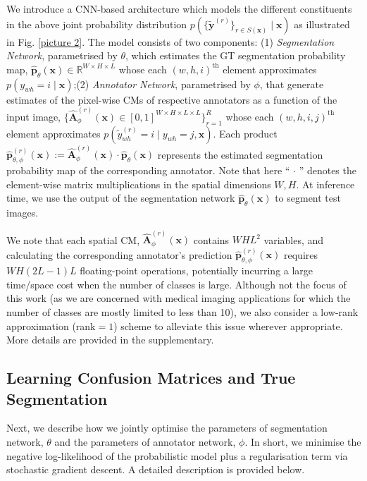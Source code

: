 We introduce a CNN-based architecture which models the different constituents in the above joint probability distribution $p(\{\tilde{\textbf{y}}^{(r)}\}_{r\in S(\mathbf{x})}\mid \textbf{x})$ as illustrated in Fig. \ref{picture 2}. The model consists of two components: (1) \textit{Segmentation Network}, parametrised by $\theta$, which estimates the GT segmentation probability map, $\hat{\textbf{p}}_{\theta}(\textbf{x}) \in \mathbb{R}^{W\times H \times L}$ whose each $(w, h, i)^\text{th}$ element approximates $p(y_{wh}=i\mid \textbf{x})$;(2) \textit{Annotator Network}, parametrised by $\phi$, that generate estimates of the pixel-wise CMs of respective annotators as a function of the input image, $\{\hat{\textbf{A}}_{\phi}^{(r)}(\textbf{x})\in [0,1]^{W\times H\times L \times L}\}_{r=1}^{R}$ whose each $(w, h, i, j)^\text{th}$ element approximates $p(\tilde{y}^{(r)}_{wh}=i\mid y_{wh}=j,\textbf{x})$. Each product ${\hat{\textbf{p}}_{\theta, \phi}^{(r)}}(\textbf{x}):=\hat{\textbf{A}}_{\phi}^{(r)}(\textbf{x})\cdot \hat{\textbf{p}}_\theta (\textbf{x})$ represents the estimated segmentation probability map of the corresponding annotator. Note that here ``$\,\cdot\,$'' denotes the element-wise matrix multiplications in the spatial dimensions $W, H$. At inference time, we use the output of the segmentation network ${\hat{\textbf{p}}_\theta }(\textbf{x})$ to segment test images. 

We note that each spatial CM, $\hat{\textbf{A}}_{\phi}^{(r)}(\textbf{x})$ contains $WHL^2$ variables, 
and calculating the corresponding annotator's prediction $\hat{\textbf{p}}_{\theta, \phi}^{(r)}(\textbf{x})$ requires $WH(2L-1)L$ floating-point operations, potentially incurring a large time/space cost when the number of classes is large. Although not the focus of this work (as we are concerned with medical imaging applications for which the number of classes are mostly limited to less than 10), we also consider a low-rank approximation (rank$=1$) scheme to alleviate this issue wherever appropriate. More details are provided in the supplementary.

\subsection{Learning Confusion Matrices and True Segmentation}

Next, we describe how we jointly optimise the parameters of segmentation network, $\theta$ and the parameters of annotator network, $\phi$. In short, we minimise the negative log-likelihood of the probabilistic model plus a regularisation term via stochastic gradient descent. A detailed description is provided below. 

